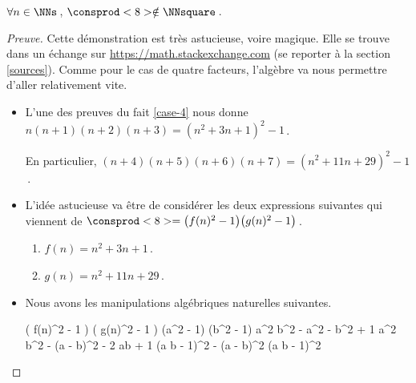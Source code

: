 \begin{fact} \label{case-8}
	 $\forall n \in \NNs$\,, $\consprod<8> \notin \NNsquare$\,.
\end{fact}


\begin{proof}[Preuve]
    Cette démonstration est très astucieuse, voire magique. Elle se trouve dans un échange sur \url{https://math.stackexchange.com} (se reporter à la section \ref{sources}).
    Comme pour le cas de quatre facteurs, l'algèbre va nous permettre d'aller relativement vite.
    
    \begin{itemize}
    	\item L'une des preuves du fait \ref{case-4} nous donne
    	$n (n + 1) (n + 2) (n + 3) = (n^2 + 3n + 1)^2 - 1$\,.
    
    	\smallskip
    	\noindent
    	En particulier,
    	$(n + 4)(n + 5)(n + 6)(n + 7) = (n^2 + 11 n + 29)^2 - 1$\,.
    
    
    	\item L'idée astucieuse va être de considérer les deux expressions suivantes qui viennent de $\consprod<8> = \big( f(n)^2 - 1 \big) \big( g(n)^2 - 1 \big)$\,.
    	\begin{enumerate}
    		\item $f(n) = n^2 + 3n + 1$\,.
    
    		\item $g(n) = n^2 + 11 n + 29$\,.
    	\end{enumerate}
    
    
    	\item Nous avons les manipulations algébriques naturelles suivantes.
    
        \noindent\kern-6pt%
        \begin{stepcalc}[style = sar]
        \explnext{}
        	\big( f(n)^2 - 1 \big) \big( g(n)^2 - 1 \big)
        	(a^2 - 1) (b^2 - 1)
        \explnext{}
        	a^2 b^2 - a^2 - b^2 + 1
        	a^2 b^2 - (a - b)^2 - 2 ab + 1
        \explnext{}
        	(a b  - 1)^2 - (a - b)^2
        	(a b  - 1)^2
        \end{stepcalc}
        
        \medskip
        

\end{itemize}
\end{proof}
